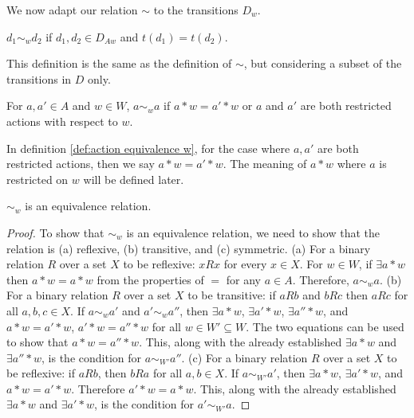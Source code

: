 We now adapt our relation $\sim$ to the transitions $D_{w}$.

\begin{definition}[$\sim_{w}$]
    $d_{1} \sim_{w} d_{2}$ if $d_{1},d_{2} \in D_{A w}$ and $t(d_{1})=t(d_{2})$.
\end{definition}

\begin{remark}
    This definition is the same as the definition of $\sim$, but considering a subset of the transitions in $D$ only.
\end{remark}

\begin{definition}[$\sim_{w}$]\label{def:action equivalence w}
    For $a,a' \in A$ and $w \in W$, $a \sim_{w} a$ if $a * w = a' * w$ or $a$ and $a'$ are both restricted actions with respect to $w$.
\end{definition}

\begin{remark}
    In definition \ref{def:action equivalence w}, for the case where $a,a'$ are both restricted actions, then we say $a * w = a' * w$.
    The meaning of $a * w$ where $a$ is restricted on $w$ will be defined later.
\end{remark}

\begin{proposition}
    $\sim_{w}$ is an equivalence relation.
\end{proposition}
\begin{proof}
    To show that $\sim_{w}$ is an equivalence relation, we need to show that the relation is (a) reflexive, (b) transitive, and (c) symmetric.
    (a) For a binary relation $R$ over a set $X$ to be reflexive: $x R x$ for every $x \in X$. For $w \in W$, if $\exists a * w$ then $a * w = a * w$ from the properties of $=$ for any $a \in A$. Therefore, $a \sim_{w} a$.
    (b) For a binary relation $R$ over a set $X$ to be transitive: if $a R b$ and $b R c$ then $a R c$ for all $a,b,c \in X$.
    If $a \sim_{w} a'$ and $a' \sim_{w} a''$, then $\exists a * w$, $\exists a' * w$, $\exists a'' * w$, and $a * w = a' * w$, $a' * w = a'' * w$ for all $w \in W' \subseteq W$.
    The two equations can be used to show that $a * w = a'' * w$.
    This, along with the already established $\exists a * w$ and $\exists a'' * w$, is the condition for $a \sim_{W'} a''$.
    (c) For a binary relation $R$ over a set $X$ to be reflexive: if $a R b$, then $b R a$ for all $a,b \in X$.
    If $a \sim_{W'} a'$, then $\exists a * w$, $\exists a' * w$, and $a * w = a' * w$. Therefore $a' * w = a * w$.
    This, along with the already established $\exists a * w$ and $\exists a' * w$, is the condition for $a' \sim_{W'} a$.
\end{proof}

